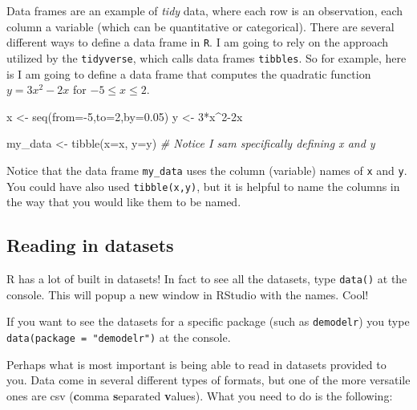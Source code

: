 \documentclass[
]{book}
\newenvironment{Shaded}{\begin{snugshade}}{\end{snugshade}}
\newcommand{\AttributeTok}[1]{\textcolor[rgb]{0.77,0.63,0.00}{#1}}
\newcommand{\CommentTok}[1]{\textcolor[rgb]{0.56,0.35,0.01}{\textit{#1}}}
\newcommand{\DecValTok}[1]{\textcolor[rgb]{0.00,0.00,0.81}{#1}}
\newcommand{\FloatTok}[1]{\textcolor[rgb]{0.00,0.00,0.81}{#1}}
\newcommand{\FunctionTok}[1]{\textcolor[rgb]{0.00,0.00,0.00}{#1}}
\newcommand{\NormalTok}[1]{#1}
\newcommand{\OtherTok}[1]{\textcolor[rgb]{0.56,0.35,0.01}{#1}}
\newcommand{\SpecialCharTok}[1]{\textcolor[rgb]{0.00,0.00,0.00}{#1}}
\theoremstyle{definition}
\theoremstyle{definition}
\theoremstyle{definition}
\theoremstyle{remark}
\begin{document}
Data frames are an example of \emph{tidy} data, where each row is an observation, each column a variable (which can be quantitative or categorical). There are several different ways to define a data frame in \texttt{R}. I am going to rely on the approach utilized by the \texttt{tidyverse}, which calls data frames \texttt{tibbles}. So for example, here is I am going to define a data frame that computes the quadratic function \(y=3x^2-2x\) for \(-5 \leq x \leq 2\).

\begin{Shaded}
\begin{Highlighting}[]
\NormalTok{x }\OtherTok{\textless{}{-}} \FunctionTok{seq}\NormalTok{(}\AttributeTok{from=}\SpecialCharTok{{-}}\DecValTok{5}\NormalTok{,}\AttributeTok{to=}\DecValTok{2}\NormalTok{,}\AttributeTok{by=}\FloatTok{0.05}\NormalTok{)}
\NormalTok{y }\OtherTok{\textless{}{-}} \DecValTok{3}\SpecialCharTok{*}\NormalTok{x}\SpecialCharTok{\^{}}\DecValTok{2}\SpecialCharTok{{-}}\NormalTok{2x}

\NormalTok{my\_data }\OtherTok{\textless{}{-}} \FunctionTok{tibble}\NormalTok{(}\AttributeTok{x=}\NormalTok{x,}
                  \AttributeTok{y=}\NormalTok{y)  }\CommentTok{\# Notice I sam specifically defining x and y}
\end{Highlighting}
\end{Shaded}

Notice that the data frame \texttt{my\_data} uses the column (variable) names of \texttt{x} and \texttt{y}. You could have also used \texttt{tibble(x,y)}, but it is helpful to name the columns in the way that you would like them to be named.

\hypertarget{reading-in-datasets}{%
\subsection{Reading in datasets}\label{reading-in-datasets}}

R has a lot of built in datasets! In fact to see all the datasets, type \texttt{data()} at the console. This will popup a new window in RStudio with the names. Cool!

If you want to see the datasets for a specific package (such as \texttt{demodelr}) you type \texttt{data(package\ =\ "demodelr")} at the console.

Perhaps what is most important is being able to read in datasets provided to you. Data come in several different types of formats, but one of the more versatile ones are csv (\textbf{c}omma \textbf{s}eparated \textbf{v}alues). What you need to do is the following:
\end{document}
